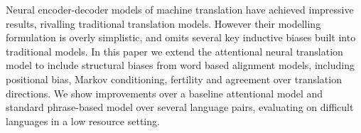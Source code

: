 Neural encoder-decoder models of machine translation have achieved impressive results, rivalling traditional translation models. However their modelling formulation is overly simplistic, and omits several key inductive biases built into traditional models. In this paper we extend the attentional neural translation model to include structural biases from word based alignment models, including positional bias, Markov conditioning, fertility and agreement over translation directions.  We show improvements over a baseline attentional model and standard phrase-based model over several language pairs, evaluating on difficult languages in a low resource setting.
